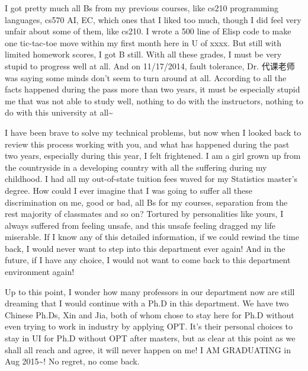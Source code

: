 \documentclass[9pt,b5paper]{article}
\begin{document}
I got pretty much all Bs from my previous courses, like cs210 programming languages, cs570 AI, EC, which ones that I liked too much, though I did feel very unfair about some of them, like cs210. I wrote a 500 line of Elisp code to make one tic-tac-toe move within my first month here in U of xxxx. But still with limited homework scores, I got B still. With all these grades, I must be very stupid to progress well at all. And on 11/17/2014, fault tolerance, Dr. 代课老师 was saying some minds don't seem to turn around at all. According to all the facts happened during the pass more than two years, it must be especially stupid me that was not able to study well, nothing to do with the instructors, nothing to do with this university at all\textasciitilde{}

I have been brave to solve my technical problems, but now when I looked back to review this process working with you, and what has happened during the past two years, especially during this year, I felt frightened. I am a girl grown up from the countryside in a developing country with all the suffering during my childhood. I had all my out-of-state tuition fees waved for my Statistics master's degree. How could I ever imagine that I was going to suffer all these discrimination on me, good or bad, all Bs for my courses, separation from the rest majority of classmates and so on? Tortured by personalities like yours, I always suffered from feeling unsafe, and this unsafe feeling dragged my life miserable. If I know any of this detailed information, if we could rewind the time back, I would never want to step into this department ever again! And in the future, if I have any choice, I would not want to come back to this department environment again! 

Up to this point, I wonder how many professors in our department now are still dreaming that I would continue with a Ph.D in this department. We have two Chinese Ph.Ds, Xin and Jia, both of whom chose to stay here for Ph.D without even trying to work in industry by applying OPT. It's their personal choices to stay in UI for Ph.D without OPT after masters, but as clear at this point as we shall all reach and agree, it will never happen on me! I AM GRADUATING in Aug 2015\textasciitilde{}! No regret, no come back. 
\end{document}
